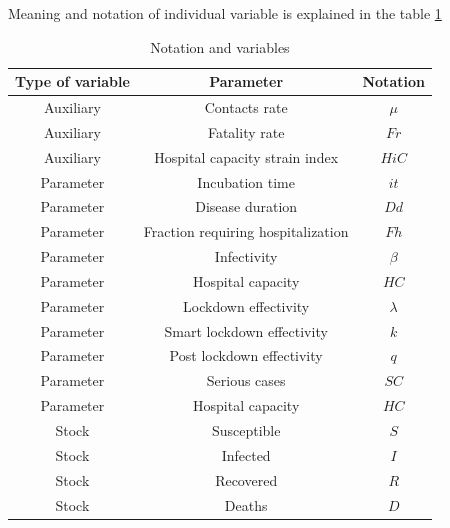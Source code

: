 \documentclass[12pt,a4paper,english]{article}
\begin{document}
    Meaning and notation of individual variable is explained in the table \ref{tab:not_var}

    \begin{table}[h!]
        \begin{center}
            \begin{tabular}{|c|c|c|}
                \hline
                Type of variable & Parameter & Notation \\
                \hline
                Auxiliary & Contacts rate                      & $\mu$  \\
                Auxiliary & Fatality rate                      & $Fr$ \\
                Auxiliary & Hospital capacity strain index     & $HiC$ \\
                Parameter & Incubation time                    & $it$ \\
                Parameter & Disease duration                   & $Dd$ \\
                Parameter & Fraction requiring hospitalization & $Fh$ \\
                Parameter & Infectivity                        & $\beta$ \\
                Parameter & Hospital capacity                  & $HC$ \\
                Parameter & Lockdown effectivity               & $\lambda$ \\
                Parameter & Smart lockdown effectivity         & $k$ \\
                Parameter & Post lockdown effectivity          & $q$ \\
                Parameter & Serious cases                      & $SC$  \\
                Parameter & Hospital capacity                  & $HC$ \\
                Stock     & Susceptible                        & $S$ \\
                Stock     & Infected                           & $I$ \\
                Stock     & Recovered                          & $R$ \\
                Stock     & Deaths                             & $D$ \\
                \hline
            \end{tabular}
        \end{center}
        \caption{Notation and variables \cite{math_article}}
        \label{tab:not_var}
    \end{table}
\end{document}
